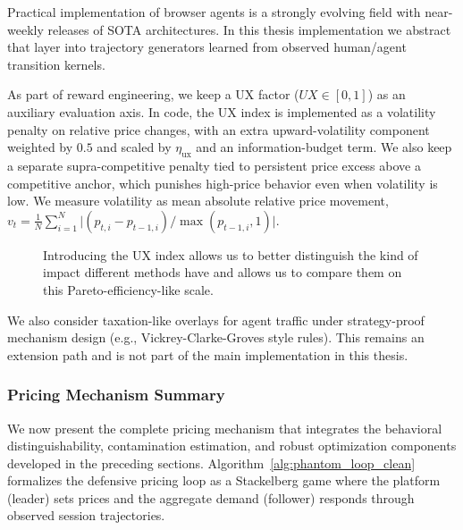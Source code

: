 Practical implementation of browser agents is a strongly evolving field with near-weekly releases of SOTA architectures. In this thesis implementation we abstract that layer into trajectory generators learned from observed human/agent transition kernels.


As part of reward engineering, we keep a UX factor ($UX\in[0,1]$) as an auxiliary evaluation axis. In code, the UX index is implemented as a volatility penalty on relative price changes, with an extra upward-volatility component weighted by $0.5$ and scaled by $\eta_{\text{ux}}$ and an information-budget term. We also keep a separate supra-competitive penalty tied to persistent price excess above a competitive anchor, which punishes high-price behavior even when volatility is low.
We measure volatility as mean absolute relative price movement, $v_t=\frac{1}{N}\sum_{i=1}^N\bigl|(p_{t,i}-p_{t-1,i})/\max(p_{t-1,i},1)\bigr|$.

\begin{figure}[ht]
  \centering
  \resizebox{0.5\columnwidth}{!}{%
    
  }
  \caption{Introducing the UX index allows us to better distinguish the kind of impact different methods have and allows us to compare them on this Pareto-efficiency-like scale.}
\end{figure}

We also consider taxation-like overlays for agent traffic under strategy-proof mechanism design (e.g., Vickrey-Clarke-Groves style rules). This remains an extension path and is not part of the main implementation in this thesis.

\subsubsection{Pricing Mechanism Summary}

We now present the complete pricing mechanism that integrates the behavioral distinguishability, contamination estimation, and robust optimization components developed in the preceding sections. Algorithm~\ref{alg:phantom_loop_clean} formalizes the defensive pricing loop as a Stackelberg game where the platform (leader) sets prices and the aggregate demand (follower) responds through observed session trajectories.

